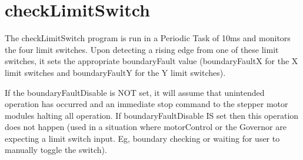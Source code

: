 				
	\section{checkLimitSwitch}
	\label{sec:PLC-flowcharts-limit}
		The checkLimitSwitch program is run in a Periodic Task of 10ms and monitors the four limit switches. Upon detecting a rising edge from one of these limit switches, it sets the appropriate boundaryFault value (boundaryFaultX for the X limit switches and boundaryFaultY for the Y limit switches).
		
		If the boundaryFaultDisable is NOT set, it will assume that unintended operation has occurred and an immediate stop command to the stepper motor modules halting all operation. If boundaryFaultDisable IS set then this operation does not happen (used in a situation where motorControl or the Governor are expecting a limit switch input. Eg, boundary checking or waiting for user to manually toggle the switch).
